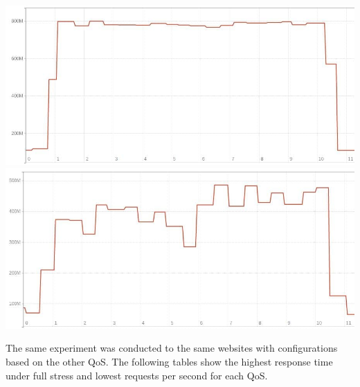 \includegraphics[width=\linewidth/2]{figures/experiment-figures/nursery_memory_usage.jpg}
\includegraphics[width=\linewidth/2]{figures/experiment-figures/fluka_memory_usage.jpg}

The same experiment was conducted to the same websites with configurations based on the other QoS. 
The following tables show the highest response time under full stress and lowest requests per second for each QoS.

